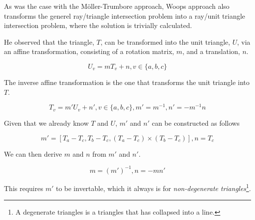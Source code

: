 
As was the case with the Möller-Trumbore approach, Woops approach also
transforms the generel ray/triangle intersection problem into a
ray/unit triangle intersection problem, where the solution is
trivially calculated.

He observed that the triangle, $T$, can be transformed into the unit
triangle, $U$, via an affine transformation, consisting of a rotation
matrix, $m$, and a translation, $n$.

\begin{displaymath}
  U_v = m T_v + n, v \in \{a, b, c\}
\end{displaymath}

The inverse affine transformation is the one that transforms the unit
triangle into $T$.

\begin{displaymath}
  T_v = m' U_v + n', v \in \{a, b, c\}, m' = m^{-1}, n' = -m^{-1}n
\end{displaymath}

Given that we already know $T$ and $U$, $m'$ and $n'$ can be
constructed as follows

\begin{displaymath}
  m' = \left[ T_a - T_c, T_b - T_c, (T_a - T_c) \times (T_b - T_c)
    \right],
  n = T_c
\end{displaymath}

We can then derive $m$ and $n$ from $m'$ and $n'$. 

\begin{displaymath}
  m = (m')^{-1},
  n = - m n'
\end{displaymath}

This requires $m'$ to be invertable, which it always is for
\textit{non-degenerate triangles}\footnote{A degenerate triangles is
  a triangles that has collapsed into a line.}.



